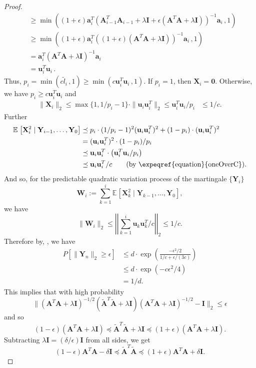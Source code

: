 \documentclass{toc}
\newcommand{\bv}[1]{\mathbf{#1}}
\newcommand{\norm}[1]{\|#1\|}
\newcommand{\expct}[3]{\mathbb{E}_{{#1}_{#2}}\left[#3\right]}
\newcommand{\prob}[1]{P\left[#1\right]}
\begin{document}
\begin{proof}
\begin{align}
                    &\geq \min((1+\epsilon)\bv{a}_i^T (\bv{A}_{i-1}^T \bv{A}_{i-1} + \lambda \bv{I} + \epsilon (\bv{A}^T\bv{A} + \lambda \bv{I}))^{-1} \bv{a}_i\,, 1) \nonumber\\
                    &\geq \min((1+\epsilon)\bv{a}_i^T ((1+\epsilon)(\bv{A}^T \bv{A} + \lambda \bv{I}))^{-1} \bv{a}_i\,, 1) \nonumber\\
                    &= \bv{a}_i^T (\bv{A}^T\bv{A} + \lambda\bv{I})^{-1} \bv{a}_i \label{ltildeBound}\\
                    &= \bv{u}_i^T\bv{u}_i\,.\nonumber
    \end{align}
    Thus,
    $
        p_i = \min(c \tilde{l}_i\,, 1) \geq \min(c \bv{u}_i^T \bv{u}_i\,, 1).
    $
    If $p_i = 1$, then $\bv{X}_i = \bv 0$.
    Otherwise, we have $p_i \geq c \bv{u}_i^T \bv{u}_i$ and
    \begin{align}\label{oneOverC}
        \|\bv{X}_i\|_2 \le \max \{ 1, 1/p_i-1 \} \cdot \norm{\bv{u}_i \bv{u}_i^T}_2 \le  \bv{u}_i^T\bv{u}_i/p_i  &\leq 1 / c.
    \end{align}
    Further
    \begin{align*}
        \expct{}{}{\bv{X}_i^2 \mid \bv{Y}_{i-1},\ldots,\bv{Y}_{0}} &\preceq p_i \cdot (1 / p_i - 1)^2 (\bv{u}_i \bv{u}_i^T)^2 + (1 - p_i) \cdot (\bv{u}_i \bv{u}_i^T)^2\\
                                &= (\bv{u}_i \bv{u}_i^T)^2 \cdot (1-p_i)/p_i\\
			&\preceq \bv{u}_i \bv{u}_i^T \cdot \left (\bv{u}_i^T\bv{u}_i /p_i \right )\\
        &\preceq \bv{u}_i \bv{u}_i^T / c\tag{\text{by
          \expeqref{equation}{oneOverC}}}.
    \end{align*}
    And so, for the predictable quadratic variation process of the martingale $\{\bv{Y}_i\}$
    $$
        \bv{W}_i := \sum_{k=1}^i \expct{}{}{\bv{X}_k^2 \mid \bv{Y}_{k-1},\ldots,\bv{Y}_{0}},
    $$
    we have
    $$
        \norm{\bv{W}_i}_2 \leq \left | \left |\sum_{k=1}^i \bv{u}_k \bv{u}_k^T / c \right | \right |_2 \le 1/c.
    $$
    Therefore by, , we have
    \begin{align*}
        \prob{\norm{\bv{Y}_n}_2\geq \epsilon} &\leq d\cdot\exp\left(\frac{-\epsilon^2/2}{1/c + \epsilon/(3c)}\right)\\
                                              &\leq d\cdot\exp(-c\epsilon^2/4)\\
                                              &= 1/d.
    \end{align*}
    This implies that with high probability
    $$
        \norm{(\bv{A}^T\bv{A} + \lambda \bv{I})^{-1/2}(\bv{\tilde{A}}^T\bv{\tilde{A}} + \lambda\bv{I})(\bv{A}^T\bv{A} + \lambda \bv{I})^{-1/2} - \bv{I}}_2 \leq \epsilon
    $$
    and so
    $$
        (1-\epsilon)(\bv{A}^T\bv{A} + \lambda \bv{I}) \preceq \bv{\tilde{A}}^T\bv{\tilde{A}} + \lambda\bv{I} \preceq (1+\epsilon)(\bv{A}^T\bv{A} + \lambda \bv{I}).
    $$
    Subtracting $\lambda\bv{I} = (\delta/\epsilon) \bv I$ from all sides, we get
    $$
        (1-\epsilon)\bv{A}^T\bv{A} - \delta\bv{I} \preceq \bv{\tilde{A}}^T\bv{\tilde{A}} \preceq (1+\epsilon)\bv{A}^T\bv{A} + \delta\bv{I}.
    $$


\end{proof}
\end{document}
